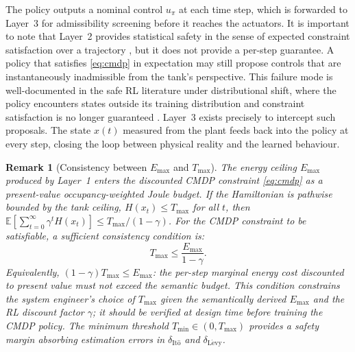 \documentclass[11pt]{article}
\newtheorem{remark}{Remark}
\begin{document}
The policy outputs a nominal control $u_\pi$ at each time step, which is forwarded to Layer~3
for admissibility screening before it reaches the actuators. It is important to note that
Layer~2 provides statistical safety in the sense of expected constraint satisfaction over a
trajectory \cite{garcia2015}, but it does not provide a per-step guarantee. A policy that
satisfies \eqref{eq:cmdp} in expectation may still propose controls that are instantaneously
inadmissible from the tank's perspective. This failure mode is well-documented in the safe RL
literature under distributional shift, where the policy encounters states outside its training
distribution and constraint satisfaction is no longer guaranteed \cite{garcia2015,achiam2017}.
Layer~3 exists precisely to intercept such proposals. The state $x(t)$ measured from the plant
feeds back into the policy at every step, closing the loop between physical reality and the
learned behaviour.

\begin{remark}[Consistency between $E_{\max}$ and $T_{\max}$]
\label{rem:consistency}
The energy ceiling $E_{\max}$ produced by Layer~1 enters the discounted CMDP constraint
\eqref{eq:cmdp} as a present-value occupancy-weighted Joule budget. If the Hamiltonian is
pathwise bounded by the tank ceiling, $H(x_t)\le T_{\max}$ for all $t$, then
$\mathbb{E}[\sum_{t=0}^\infty\gamma^t H(x_t)]\le T_{\max}/(1-\gamma)$. For the CMDP
constraint to be satisfiable, a sufficient consistency condition is:
\begin{equation}
T_{\max}\le\frac{E_{\max}}{1-\gamma}.
\label{eq:consist}
\end{equation}
Equivalently, $(1-\gamma)T_{\max}\le E_{\max}$: the per-step marginal energy cost discounted
to present value must not exceed the semantic budget. This condition constrains the system
engineer's choice of $T_{\max}$ given the semantically derived $E_{\max}$ and the RL discount
factor $\gamma$; it should be verified at design time before training the CMDP policy. The
minimum threshold $T_{\min}\in(0,T_{\max})$ provides a safety margin absorbing estimation
errors in $\delta_{\mathrm{It\hat{o}}}$ and $\delta_{\mathrm{L\acute{e}vy}}$.
\end{remark}
\end{document}
